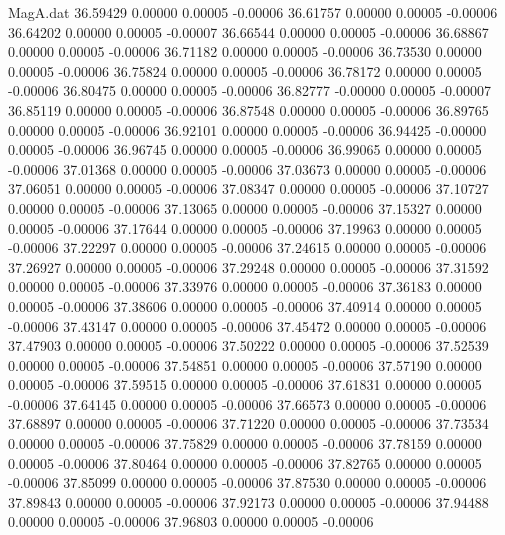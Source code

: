\begin{filecontents}{MagA.dat}
  36.59429    0.00000    0.00005   -0.00006
  36.61757    0.00000    0.00005   -0.00006
  36.64202    0.00000    0.00005   -0.00007
  36.66544    0.00000    0.00005   -0.00006
  36.68867    0.00000    0.00005   -0.00006
  36.71182    0.00000    0.00005   -0.00006
  36.73530    0.00000    0.00005   -0.00006
  36.75824    0.00000    0.00005   -0.00006
  36.78172    0.00000    0.00005   -0.00006
  36.80475    0.00000    0.00005   -0.00006
  36.82777   -0.00000    0.00005   -0.00007
  36.85119    0.00000    0.00005   -0.00006
  36.87548    0.00000    0.00005   -0.00006
  36.89765    0.00000    0.00005   -0.00006
  36.92101    0.00000    0.00005   -0.00006
  36.94425   -0.00000    0.00005   -0.00006
  36.96745    0.00000    0.00005   -0.00006
  36.99065    0.00000    0.00005   -0.00006
  37.01368    0.00000    0.00005   -0.00006
  37.03673    0.00000    0.00005   -0.00006
  37.06051    0.00000    0.00005   -0.00006
  37.08347    0.00000    0.00005   -0.00006
  37.10727    0.00000    0.00005   -0.00006
  37.13065    0.00000    0.00005   -0.00006
  37.15327    0.00000    0.00005   -0.00006
  37.17644    0.00000    0.00005   -0.00006
  37.19963    0.00000    0.00005   -0.00006
  37.22297    0.00000    0.00005   -0.00006
  37.24615    0.00000    0.00005   -0.00006
  37.26927    0.00000    0.00005   -0.00006
  37.29248    0.00000    0.00005   -0.00006
  37.31592    0.00000    0.00005   -0.00006
  37.33976    0.00000    0.00005   -0.00006
  37.36183    0.00000    0.00005   -0.00006
  37.38606    0.00000    0.00005   -0.00006
  37.40914    0.00000    0.00005   -0.00006
  37.43147    0.00000    0.00005   -0.00006
  37.45472    0.00000    0.00005   -0.00006
  37.47903    0.00000    0.00005   -0.00006
  37.50222    0.00000    0.00005   -0.00006
  37.52539    0.00000    0.00005   -0.00006
  37.54851    0.00000    0.00005   -0.00006
  37.57190    0.00000    0.00005   -0.00006
  37.59515    0.00000    0.00005   -0.00006
  37.61831    0.00000    0.00005   -0.00006
  37.64145    0.00000    0.00005   -0.00006
  37.66573    0.00000    0.00005   -0.00006
  37.68897    0.00000    0.00005   -0.00006
  37.71220    0.00000    0.00005   -0.00006
  37.73534    0.00000    0.00005   -0.00006
  37.75829    0.00000    0.00005   -0.00006
  37.78159    0.00000    0.00005   -0.00006
  37.80464    0.00000    0.00005   -0.00006
  37.82765    0.00000    0.00005   -0.00006
  37.85099    0.00000    0.00005   -0.00006
  37.87530    0.00000    0.00005   -0.00006
  37.89843    0.00000    0.00005   -0.00006
  37.92173    0.00000    0.00005   -0.00006
  37.94488    0.00000    0.00005   -0.00006
  37.96803    0.00000    0.00005   -0.00006

\end{filecontents}
